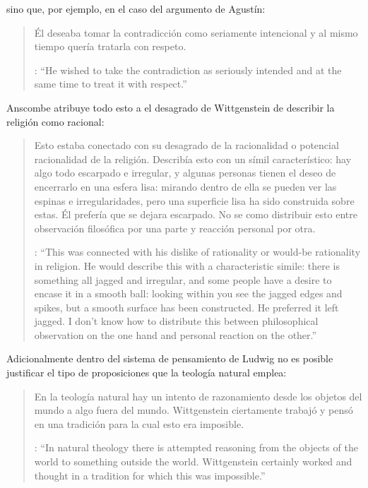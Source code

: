sino que, por ejemplo, en el caso del argumento de Agustín: \blockquote[{\cite[122]{anscombe1981parmenides:qli}}: \enquote{He wished to take the contradiction as seriously intended and at the same time to treat it with respect.}]{Él deseaba tomar la contradicción como seriamente intencional y al mismo tiempo quería tratarla con respeto.}

Anscombe atribuye todo esto a el desagrado de Wittgenstein de describir la religión como racional: \blockquote[{\cite[122]{anscombe1981parmenides:qli}}: \enquote{This was connected with his dislike of rationality or would-be rationality in religion. He would describe this with a characteristic simile: there is something all jagged and irregular, and some people have a desire to encase it in a smooth ball: looking within you see the jagged edges and spikes, but a smooth surface has been constructed. He preferred it left jagged. I don't know how to distribute this between philosophical observation on the one hand and personal reaction on the other.}]{Esto estaba conectado con su desagrado de la racionalidad o potencial racionalidad de la religión. Describía esto con un símil característico: hay algo todo escarpado e irregular, y algunas personas tienen el deseo de encerrarlo en una esfera lisa: mirando dentro de ella se pueden ver las espinas e irregularidades, pero una superficie lisa ha sido construida sobre estas. Él prefería que se dejara escarpado. No se como distribuir esto entre observación filosófica por una parte y reacción personal por otra.} Adicionalmente dentro del sistema de pensamiento de Ludwig no es posible justificar el tipo de proposiciones que la teología natural emplea: \blockquote[{\cite[123]{anscombe1981parmenides:qli}}: \enquote{In natural theology there is attempted reasoning from the objects of the world to something outside the world. Wittgenstein certainly worked and thought in a tradition for which this was impossible.}]{En la teología natural hay un intento de razonamiento desde los objetos del mundo a algo fuera del mundo. Wittgenstein ciertamente trabajó y pensó en una tradición para la cual esto era imposible.}

